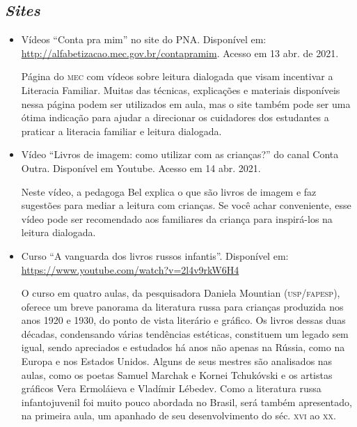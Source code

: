 \documentclass[11pt]{extarticle}
\begin{document}
\subsection{\textit{Sites}}

\begin{itemize}
\item Vídeos “Conta pra mim” no site do PNA. Disponível em: \url{http://alfabetizacao.mec.gov.br/contapramim}. 
Acesso em 13 abr. de 2021.

Página do \textsc{mec} com vídeos sobre leitura dialogada que visam incentivar a Literacia Familiar. Muitas das 
técnicas, explicações e materiais disponíveis nessa página podem ser utilizados em aula, mas o site também 
pode ser uma ótima indicação para ajudar a direcionar os cuidadores dos estudantes a praticar 
a literacia familiar e leitura dialogada.

\item Vídeo “Livros de imagem: como utilizar com as crianças?” do canal Conta Outra. Disponível em Youtube. 
Acesso em 14 abr. 2021. 

Neste vídeo, a pedagoga Bel explica o que são livros de imagem e faz sugestões para mediar a leitura com 
crianças. Se você achar conveniente, esse vídeo pode ser recomendado aos familiares da criança 
para inspirá-los na leitura dialogada. 


\item Curso ``A vanguarda dos livros russos infantis''. Disponível em: 
\url{https://www.youtube.com/watch?v=2l4v9rkW6H4}

O curso em quatro aulas, da pesquisadora Daniela Mountian (\textsc{usp/fapesp}),
oferece um breve panorama da literatura russa para crianças produzida
nos anos 1920 e 1930, do ponto de vista literário e gráfico. Os livros
dessas duas décadas, condensando várias tendências estéticas, constituem
um legado sem igual, sendo apreciados e estudados há anos não apenas na
Rússia, como na Europa e nos Estados Unidos. Alguns de seus mestres são
analisados nas aulas, como os poetas Samuel Marchak e Kornei Tchukóvski
e os artistas gráficos Vera Ermoláieva e Vladímir Lébedev. Como a
literatura russa infantojuvenil foi muito pouco abordada no Brasil, será
também apresentado, na primeira aula, um apanhado de seu desenvolvimento
do séc. \textsc{xvi} ao \textsc{xx}.
\end{itemize}
\end{document}
